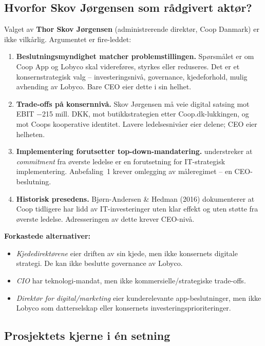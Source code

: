 \subsection{Hvorfor Skov Jørgensen som rådgivert aktør?}

Valget av \textbf{Thor Skov Jørgensen} (administrerende direktør, Coop
Danmark) er ikke vilkårlig. Argumentet er fire-leddet:

\begin{enumerate}
  \item \textbf{Beslutningsmyndighet matcher problemstillingen.} Spørsmålet
    er om Coop App og Lobyco skal videreføres, styrkes eller reduseres. Det
    er et konsernstrategisk valg -- investeringsnivå, governance,
    kjedeforhold, mulig avhending av Lobyco. Bare CEO eier dette i sin
    helhet.
  \item \textbf{Trade-offs på konsernnivå.} Skov Jørgensen må veie digital
    satsing mot EBIT $-$215 mill. DKK, mot butikkstrategien etter
    Coop.dk-lukkingen, og mot Coops kooperative identitet. Lavere
    ledelsesnivåer eier delene; CEO eier helheten.
  \item \textbf{Implementering forutsetter top-down-mandatering.}  understreker at \emph{commitment} fra øverste ledelse er
    en forutsetning for IT-strategisk implementering. Anbefaling~1 krever
    omlegging av måleregimet -- en CEO-beslutning.
  \item \textbf{Historisk presedens.} Bjørn-Andersen \& Hedman (2016)
    dokumenterer at Coop tidligere har lidd av IT-investeringer uten klar
    effekt og uten støtte fra øverste ledelse. Adresseringen av dette
    krever CEO-nivå.
\end{enumerate}

\textbf{Forkastede alternativer:}
\begin{itemize}
  \item \emph{Kjededirektørene} eier driften av sin kjede, men ikke
    konsernets digitale strategi. De kan ikke beslutte governance av Lobyco.
  \item \emph{CIO} har teknologi-mandat, men ikke kommersielle/strategiske
    trade-offs.
  \item \emph{Direktør for digital/marketing} eier kunderelevante
    app-beslutninger, men ikke Lobyco som datterselskap eller konsernets
    investeringsprioriteringer.
\end{itemize}

\subsection{Prosjektets kjerne i én setning}


